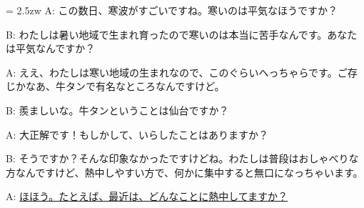 \documentclass[11pt]{amsart}
\title{}
\author{}
\newenvironment{hangall}[1]{\hangindent = 2.5zw\everypar{\hangindent = 2.5zw}}{}
\begin{document}
\maketitle
\begin{hangall}{}%
A: この数日、寒波がすごいですね。寒いのは平気なほうですか？

B: わたしは暑い地域で生まれ育ったので寒いのは本当に苦手なんです。あなたは平気なんですか？

A: ええ、わたしは寒い地域の生まれなので、このぐらいへっちゃらです。ご存じかなあ、牛タンで有名なところなんですけど。

B: 羨ましいな。牛タンということは仙台ですか？

A: 大正解です！もしかして、いらしたことはありますか？

B: そうですか？そんな印象なかったですけどね。わたしは普段はおしゃべりな方なんですけど、熱中しやすい方で、何かに集中すると無口になっちゃいます。

A: \ul{ほほう。たとえば、最近は、どんなことに熱中してますか？}\end{hangall}
\end{document}
